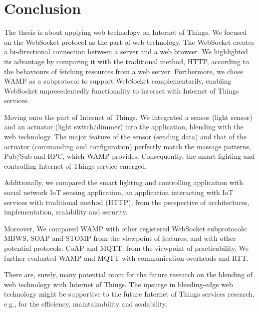 \chapter{Conclusion}
\label{chapter:conclusion}

The thesis is about applying web technology on Internet of Things. We focused on the WebSocket protocol as the part of web technology. The WebSocket creates a bi-directional connection between a server and a web browser. We highlighted its advantage by comparing it with the traditional method, HTTP, according to the behaviours of fetching resources from a web server. Furthermore, we chose WAMP as a subprotocol to support WebSocket complementarily, enabling WebSocket unprecedentedly functionality to interact with Internet of Things services. 

Moving onto the part of Internet of Things, We integrated a sensor (light sensor) and an actuator (light switch/dimmer) into the application, blending with the web technology. The major feature of the sensor (sending data) and that of the actuator (commanding and configuration) perfectly match the massage patterns, Pub/Sub and RPC, which WAMP provides. Consequently, the smart lighting and controlling Internet of Things service emerged. 

Additionally, we compared the smart lighting and controlling application with social network IoT sensing application, an application interacting with IoT services with traditional method (HTTP), from the perspective of architectures, implementation, scalability and security. 

Moreover, We compared WAMP with other registered WebSocket subprotocols: MBWS, SOAP and STOMP from the viewpoint of features; and with other potential protocols: CoAP and MQTT, from the viewpoint of practicability. We further evaluated WAMP and MQTT with communication overheads and RTT. 

There are, surely, many potential room for the future research on the blending of web technology with Internet of Things. The upsurge in bleeding-edge web technology might be supportive to the future Internet of Things services research, e.g., for the efficiency, maintainability and scalability. 

